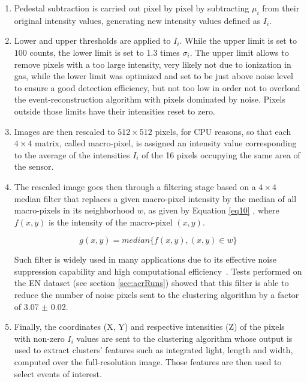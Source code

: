 \documentclass[a4paper,11pt]{article}
\begin{document}
\begin{enumerate}
\addtocounter{enumi}{0}
    
    \item Pedestal subtraction is carried out pixel by pixel by subtracting $\mu_i$ from their original intensity values, generating new intensity values defined as $I_i$. 

    \item Lower and upper thresholds are applied to $I_i$.
    While the upper limit is set to $100$ counts, the lower limit is set to 1.3 times $\sigma_i$.
    The upper limit allows to remove pixels with a too large intensity, very likely not due to ionization in gas, while the lower limit was optimized and set to be just above noise level to ensure a good detection efficiency, but not too low in order not to overload the event-reconstruction algorithm with pixels dominated by noise. Pixels outside those limits have their intensities reset to zero.
    
    
    \item Images are then rescaled to $512 \times 512$ pixels, for CPU reasons, so that each $4 \times 4$ matrix, called macro-pixel, is assigned an intensity value corresponding to the average of the intensities $I_i$ of the 16 pixels occupying the same area of the sensor. %
    
    \item The rescaled image goes then through a filtering stage based on a $4 \times 4$ median filter that replaces a given macro-pixel intensity by the median of all macro-pixels in its neighborhood $w$, as given by Equation \ref{eq10} \cite{filterStudy}, where $f(x,y)$ is the intensity of the macro-pixel $(x,y)$.
    
     \begin{equation}
             g(x,y) = median\{f(x,y), (x,y) \in w\}
             \label{eq10}
         \end{equation}
        
    Such filter is widely used in many applications due to its effective noise suppression capability and high computational efficiency~\cite{Dong_2007}.
    Tests performed on the EN dataset (see section \ref{sec:acrRuns}) showed that this filter is able to reduce the number of noise pixels sent to the clustering algorithm by a factor of 3.07 $\pm$ 0.02.
    
    
        
        
  
    
    \item Finally, the coordinates (X, Y) and respective intensities (Z) of the pixels with non-zero $I_i$ values are sent to the clustering algorithm whose output is used to extract clusters' features such as integrated light, length and width, computed over the full-resolution image. Those features are then used to select events of interest. 
\end{enumerate}
\end{document}
